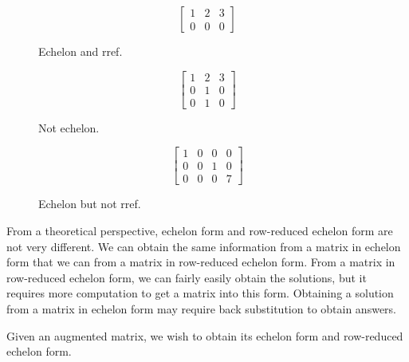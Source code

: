 \documentclass[11pt]{article}
\begin{document}
\begin{figure}
\centering
$$\begin{bmatrix}
1 & 2 & 3
\\
0 & 0 & 0
\end{bmatrix}$$
\caption{Echelon and rref.}
\end{figure}
\begin{figure}
\centering
$$\begin{bmatrix}
1 & 2 & 3
\\
0 & 1 & 0
\\
0 & 1 & 0
\end{bmatrix}$$
\caption{Not echelon.}
\end{figure}
\begin{figure}
\centering
$$\begin{bmatrix}
1 & 0 & 0 & 0
\\
0 & 0 & 1 & 0
\\
0 & 0 & 0 & 7
\end{bmatrix}$$
\caption{Echelon but not rref.}
\end{figure}

From a theoretical perspective, echelon form and row-reduced echelon form are not very different. We can obtain the same information from a matrix in echelon form that we can from a matrix in row-reduced echelon form. From a matrix in row-reduced echelon form, we can fairly easily obtain the solutions, but it requires more computation to get a matrix into this form. Obtaining a solution from a matrix in echelon form may require back substitution to obtain answers.

Given an augmented matrix, we wish to obtain its echelon form and row-reduced echelon form.
\end{document}
